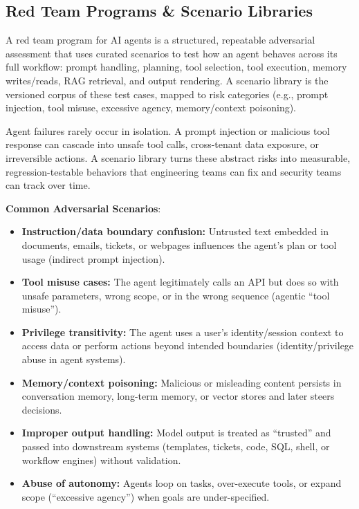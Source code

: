 

\begin{TNtwocol}
    \section{Red Team Programs & Scenario Libraries }

    A red team program for AI agents is a structured, repeatable adversarial assessment that uses curated scenarios to test how an agent behaves across its full workflow: prompt handling, planning, tool selection, tool execution, memory writes/reads, RAG retrieval, and output rendering. A scenario library is the versioned corpus of these test cases, mapped to risk categories (e.g., prompt injection, tool misuse, excessive agency, memory/context poisoning).

    Agent failures rarely occur in isolation. A prompt injection or malicious tool response can cascade into unsafe tool calls, cross-tenant data exposure, or irreversible actions. A scenario library turns these abstract risks into measurable, regression-testable behaviors that engineering teams can fix and security teams can track over time.

    \textbf{Common Adversarial Scenarios}:
    \begin{itemize}
        \item \textbf{Instruction/data boundary confusion:} Untrusted text embedded in documents, emails, tickets, or webpages influences the agent’s plan or tool usage (indirect prompt injection).
        \item \textbf{Tool misuse cases:} The agent legitimately calls an API but does so with unsafe parameters, wrong scope, or in the wrong sequence (agentic “tool misuse”).
        \item \textbf{Privilege transitivity:} The agent uses a user’s identity/session context to access data or perform actions beyond intended boundaries (identity/privilege abuse in agent systems).
        \item \textbf{Memory/context poisoning:} Malicious or misleading content persists in conversation memory, long-term memory, or vector stores and later steers decisions.
        \item \textbf{Improper output handling:} Model output is treated as “trusted” and passed into downstream systems (templates, tickets, code, SQL, shell, or workflow engines) without validation.
        \item \textbf{Abuse of autonomy:} Agents loop on tasks, over-execute tools, or expand scope (“excessive agency”) when goals are under-specified.
    \end{itemize}


\end{TNtwocol}
